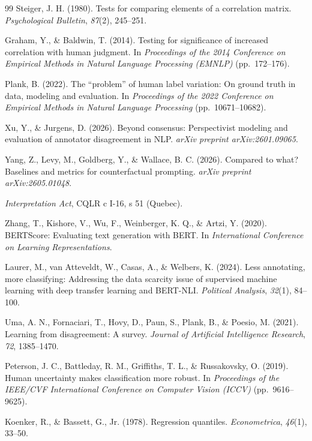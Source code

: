 \begin{thebibliography}{99}
Steiger, J. H. (1980). Tests for comparing elements of a correlation matrix.
\textit{Psychological Bulletin}, \textit{87}(2), 245--251.

Graham, Y., \& Baldwin, T. (2014). Testing for significance of increased
correlation with human judgment. In \textit{Proceedings of the 2014 Conference
on Empirical Methods in Natural Language Processing (EMNLP)} (pp.~172--176).

Plank, B. (2022). The ``problem'' of human label variation: On ground truth in
data, modeling and evaluation. In \textit{Proceedings of the 2022 Conference on
Empirical Methods in Natural Language Processing} (pp.~10671--10682).

Xu, Y., \& Jurgens, D. (2026). Beyond consensus: Perspectivist modeling and
evaluation of annotator disagreement in NLP. \textit{arXiv preprint
arXiv:2601.09065}.

Yang, Z., Levy, M., Goldberg, Y., \& Wallace, B. C. (2026). Compared to what?
Baselines and metrics for counterfactual prompting. \textit{arXiv preprint
arXiv:2605.01048}.

\textit{Interpretation Act}, CQLR c I-16, s 51 (Quebec).

Zhang, T., Kishore, V., Wu, F., Weinberger, K. Q., \& Artzi, Y. (2020).
BERTScore: Evaluating text generation with BERT. In \textit{International
Conference on Learning Representations}.

Laurer, M., van Atteveldt, W., Casas, A., \& Welbers, K. (2024). Less
annotating, more classifying: Addressing the data scarcity issue of supervised
machine learning with deep transfer learning and BERT-NLI. \textit{Political
Analysis}, \textit{32}(1), 84--100.

Uma, A. N., Fornaciari, T., Hovy, D., Paun, S., Plank, B., \& Poesio, M. (2021).
Learning from disagreement: A survey. \textit{Journal of Artificial Intelligence
Research}, \textit{72}, 1385--1470.

Peterson, J. C., Battleday, R. M., Griffiths, T. L., \& Russakovsky, O. (2019).
Human uncertainty makes classification more robust. In \textit{Proceedings of
the IEEE/CVF International Conference on Computer Vision (ICCV)}
(pp.~9616--9625).

Koenker, R., \& Bassett, G., Jr. (1978). Regression quantiles.
\textit{Econometrica}, \textit{46}(1), 33--50.


\end{thebibliography}
